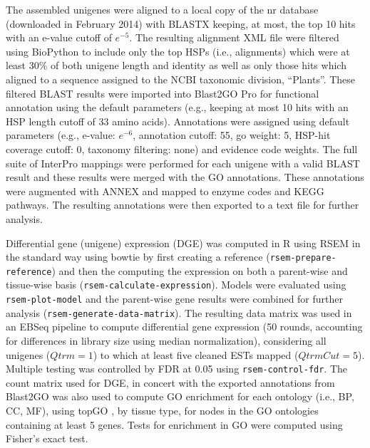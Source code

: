 \documentclass[11pt]{article}
\begin{document}
The assembled unigenes were aligned to a local copy of the nr database
(downloaded in February 2014) with BLASTX \citep{citeulike:238188}
keeping, at most, the top 10 hits with an e-value cutoff of
$e^{-5}$. The resulting alignment XML file were filtered using
BioPython \citep[v.\ 1.6.4]{citeulike:4202607} to include only the top
HSPs (i.e., alignments) which were at least 30\% of both unigene
length and identity as well as only those hits which aligned to a
sequence assigned to the NCBI taxonomic division, ``Plants''. These
filtered BLAST results were imported into Blast2GO Pro \citep[v.\
2.7.2, bg2\_may14]{citeulike:2733895} for functional annotation using
the default parameters (e.g., keeping at most 10 hits with an HSP
length cutoff of 33 amino acids).  Annotations were assigned using
default parameters (e.g., e-value: $e^{-6}$, annotation cutoff: 55, go
weight: 5, HSP-hit coverage cutoff: 0, taxonomy filtering: none) and
evidence code weights. The full suite of InterPro
\citep{citeulike:12942060} mappings were performed for each unigene
with a valid BLAST result and these results were merged with the GO
annotations.  These annotations were augmented with ANNEX
\citep{annex} and mapped to enzyme codes and KEGG
\citep{citeulike:9172127} pathways. The resulting annotations were
then exported to a text file for further analysis. 

Differential gene (unigene) expression (DGE) was computed in R
\citep[v. 3.1.1]{R} using RSEM
\citep[v. 1.2.15]{Li:BmcBioinformatics:2011} in the standard way using
bowtie \citep[v. 2.2.3]{Langmead:NatMethods:2012} by first creating a
reference (\texttt{rsem-prepare-reference}) and then the computing the
expression on both a parent-wise and tissue-wise basis
(\texttt{rsem-calculate-expression}). Models were evaluated using
\texttt{rsem-plot-model} and the parent-wise gene results were
combined for further analysis
(\texttt{rsem-generate-data-matrix}). The resulting data matrix was
used in an EBSeq \citep{Leng:Bioinformatics:2013} pipeline to compute
differential gene expression (50 rounds, accounting for differences in
library size using median normalization), considering all unigenes
($Qtrm=1$) to which at least five cleaned ESTs mapped
($QtrmCut=5$). Multiple testing was controlled by FDR
\citep{benjamini1995controlling} at 0.05 using
\texttt{rsem-control-fdr}.  The count matrix used for DGE, in concert
with the exported annotations from Blast2GO was also used to compute
GO enrichment for each ontology (i.e., BP, CC, MF), using topGO
\citep{topgo}, by tissue type, for nodes in the GO ontologies
containing at least 5 genes.  Tests for enrichment in GO were computed
using Fisher's exact test.
\end{document}

